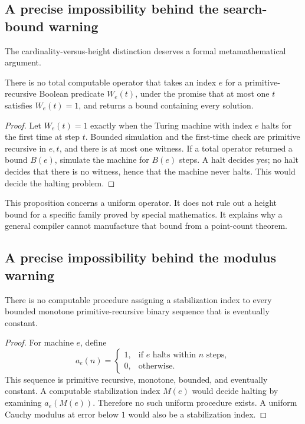 \subsection{A precise impossibility behind the search-bound warning}

The cardinality-versus-height distinction deserves a formal metamathematical
argument.

\begin{proposition}
There is no total computable operator that takes an index \(e\) for a
primitive-recursive Boolean predicate \(W_e(t)\), under the promise that at
most one \(t\) satisfies \(W_e(t)=1\), and returns a bound containing every
solution.
\end{proposition}

\begin{proof}
Let \(W_e(t)=1\) exactly when the Turing machine with index \(e\) halts for the
first time at step \(t\).  Bounded simulation and the first-time check are
primitive recursive in \(e,t\), and there is at most one witness.  If a total
operator returned a bound \(B(e)\), simulate the machine for \(B(e)\) steps.
A halt decides yes; no halt decides that there is no witness, hence that the
machine never halts.  This would decide the halting problem.
\end{proof}

This proposition concerns a uniform operator.  It does not rule out a height
bound for a specific family proved by special mathematics.  It explains why a
general compiler cannot manufacture that bound from a point-count theorem.

\subsection{A precise impossibility behind the modulus warning}

\begin{proposition}
There is no computable procedure assigning a stabilization index to every
bounded monotone primitive-recursive binary sequence that is eventually
constant.
\end{proposition}

\begin{proof}
For machine \(e\), define
\[
 a_e(n)=
 \begin{cases}
 1,&\text{if \(e\) halts within \(n\) steps},\\
 0,&\text{otherwise}.
 \end{cases}
\]
This sequence is primitive recursive, monotone, bounded, and eventually
constant.  A computable stabilization index \(M(e)\) would decide halting by
examining \(a_e(M(e))\).  Therefore no such uniform procedure exists.  A
uniform Cauchy modulus at error below \(1\) would also be a stabilization
index.
\end{proof}

